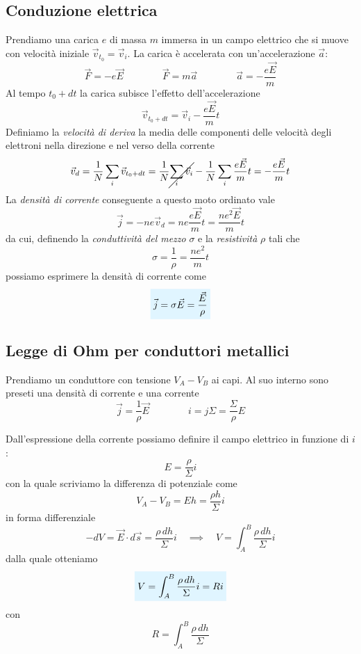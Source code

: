\documentclass[x11names]{report}
\begin{document}
\subsection{Conduzione elettrica}
Prendiamo una carica \(e\) di massa \(m\) immersa in un campo elettrico che si muove con velocità iniziale \(\vec{v}_{t_0} = \vec{v}_i\). La carica è accelerata con un'accelerazione \(\vec{a}\):
\[
\vec{F} = -e\vec{E} \qquad \qquad \vec{F} = m \vec{a} \qquad \qquad \vec{a} = -\frac{e\vec{E}}{m}
\]
Al tempo \(t_0 + dt\) la carica subisce l'effetto dell'accelerazione
\[
\vec{v}_{t_0+dt} = \vec{v}_i -\frac{e\vec{E}}{m}t
\]
Definiamo la \textit{velocità di deriva} la media delle componenti delle velocità degli elettroni nella direzione e nel verso della corrente
\[
	\vec{v}_d = \frac{1}{N}\sum_i \vec{v}_{t_0 + dt} = \frac{1}{N}\cancel{\sum_i \vec{v}_i} - \frac{1}{N}\sum_i\frac{e\vec{E}}{m}t 
	= -\frac{e\vec{E}}{m}t
\]
La \textit{densità di corrente} conseguente a questo moto ordinato vale
\[
\vec{j} = -ne\vec{v}_d = ne\frac{e\vec{E}}{m}t = \frac{ne^2\vec{E}}{m}t
\]
da cui, definendo la \textit{conduttività del mezzo} \(\sigma\) e la \textit{resistività} \(\rho\) tali che
\[
\sigma = \frac{1}{\rho}= \frac{ne^2}{m}t
\]
possiamo esprimere la densità di corrente come
\begin{equation}
	\viola{\vec{j} = \sigma \vec{E} = \frac{\vec{E}}{\rho}}
\end{equation}
\begin{center}
	\textcolor{red}{}
\end{center}

\subsection{Legge di Ohm per conduttori metallici}
Prendiamo un conduttore con tensione \(V_A - V_B\) ai capi. Al suo interno sono preseti una densità di corrente e una corrente
\[
\vec{j} = \frac{1}{\rho}\vec{E} \qquad \qquad i = j\Sigma = \frac{\Sigma}{\rho}E
\]
\begin{figure}[H]
	\centering
\end{figure}
Dall'espressione della corrente possiamo definire il campo elettrico in funzione di \(i\):
\[
E = \frac{\rho}{\Sigma}i
\]
con la quale scriviamo la differenza di potenziale come
\[
V_A - V_B = Eh = \frac{\rho h}{\Sigma}i
\]
in forma differenziale
\[
-dV = \vec{E}\cdot d\vec{s} = \frac{\rho \, dh}{\Sigma}i \quad \implies \quad V = \int_A^B\frac{\rho \, dh}{\Sigma}i
\]
dalla quale otteniamo
\begin{equation}
	\viola{V = \int_A^B\frac{\rho \, dh}{\Sigma}i = Ri}
\end{equation}
con 
\[
R =  \int_A^B\frac{\rho \, dh}{\Sigma}
\]
\end{document}
